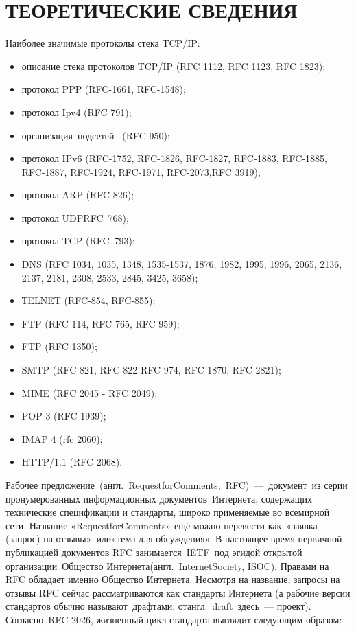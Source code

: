 \section{ТЕОРЕТИЧЕСКИЕ СВЕДЕНИЯ}

Наиболее значимые протоколы стека TCP/IP:
\begin{itemize}
\item описание стека протоколов TCP/IP (RFC 1112, RFC 1123, RFC 1823);
\item протокол PPP (RFC-1661,  RFC-1548);
\item протокол Ipv4 (RFC 791);
\item организация подсетей  (RFC 950);
\item протокол IPv6 (RFC-1752, RFC-1826, RFC-1827, RFC-1883, RFC-1885, RFC-1887, RFC-1924, RFC-1971, RFC-2073,RFC 3919);
\item протокол ARP (RFC 826);
\item протокол UDPRFC 768);
\item протокол TCP (RFC 793);
\item DNS (RFC 1034, 1035, 1348, 1535-1537, 1876, 1982, 1995, 1996, 2065, 2136, 2137, 2181, 2308, 2533, 2845, 3425, 3658);
\item ТELNET (RFC-854, RFC-855);
\item FTP (RFC 114, RFC 765, RFC 959);
\item FTP (RFC 1350);
\item SMTP (RFC 821, RFC 822 RFC 974, RFC 1870, RFC 2821);
\item MIME (RFC 2045 - RFC 2049);
\item POP 3 (RFC 1939);
\item IMAP 4   (rfc 2060);
\item HTTP/1.1 (RFC 2068).
\end{itemize}

Рабочее предложение (англ. RequestforComments, RFC) --- документ из серии пронумерованных
информационных документов Интернета, содержащих технические спецификации и стандарты,
широко применяемые во всемирной сети. Название «RequestforComments» ещё можно перевести
как «заявка (запрос) на отзывы» или«тема для обсуждения». В настоящее время первичной
публикацией документов RFC занимается IETF под эгидой открытой организации Общество
Интернета(англ. InternetSociety, ISOC). Правами на RFC обладает именно Общество Интернета.
Несмотря на название, запросы на отзывы RFC сейчас рассматриваются как стандарты
Интернета (а рабочие версии стандартов обычно называют драфтами,
отангл. draft здесь --- проект). Согласно RFC 2026, жизненный цикл
стандарта выглядит следующим образом:


